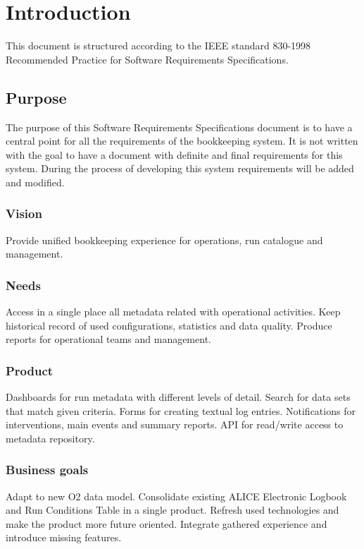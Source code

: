 \chapter{Introduction}
This document is structured according to the IEEE standard 830-1998 Recommended Practice for Software Requirements Specifications.

 
\section{Purpose}
The purpose of this Software Requirements Specifications document is to have a central point for all the requirements of the bookkeeping system. It is not written with the goal to have a document with definite and final requirements for this system. During the process of developing this system requirements will be added and modified.

\subsection{Vision}
Provide unified bookkeeping experience for operations, run catalogue and management.

\subsection{Needs}
Access in a single place all metadata related with operational activities. Keep historical record of used configurations, statistics and data quality. Produce reports for operational teams and management. 

\subsection{Product}
Dashboards for run metadata with different levels of detail. Search for data sets that match given criteria. Forms for creating textual log entries. Notifications for interventions, main events and summary reports. API for read/write access to metadata repository. 


\subsection{Business goals}
Adapt to new O2 data model. Consolidate existing ALICE Electronic Logbook and Run Conditions Table in a single product. Refresh used technologies and make the product more future oriented. Integrate gathered experience and introduce missing features. 



